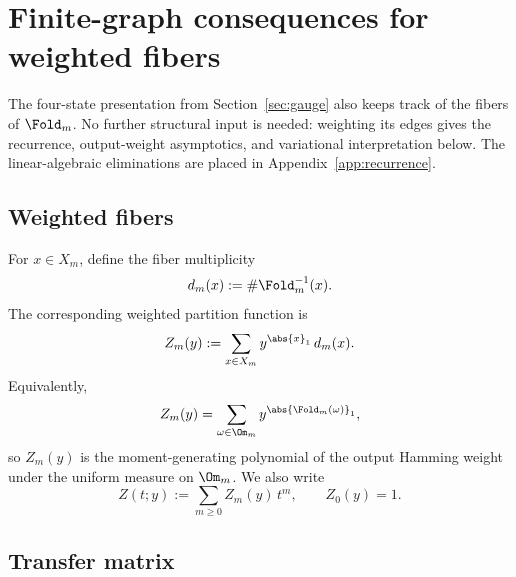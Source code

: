 \section{Finite-graph consequences for weighted fibers}
\label{sec:partition}

The four-state presentation from Section~\ref{sec:gauge} also keeps track of the fibers of \(\Fold_m\). No further structural input is needed: weighting its edges gives the recurrence, output-weight asymptotics, and variational interpretation below. The linear-algebraic eliminations are placed in Appendix~\ref{app:recurrence}.

\subsection{Weighted fibers}

For \(x\in X_m\), define the fiber multiplicity
\[
d_m(x):=\#\Fold_m^{-1}(x).
\]
The corresponding weighted partition function is
\begin{equation}\label{eq:Zm}
Z_m(y):=\sum_{x\in X_m} y^{\abs{x}_1}\, d_m(x).
\end{equation}
Equivalently,
\[
Z_m(y)=\sum_{\omega\in\Om_m} y^{\abs{\Fold_m(\omega)}_1},
\]
so \(Z_m(y)\) is the moment-generating polynomial of the output Hamming weight under the uniform measure on \(\Om_m\). We also write
\[
Z(t;y):=\sum_{m\ge 0} Z_m(y)\,t^m,
\qquad
Z_0(y)=1.
\]

\subsection{Transfer matrix}

